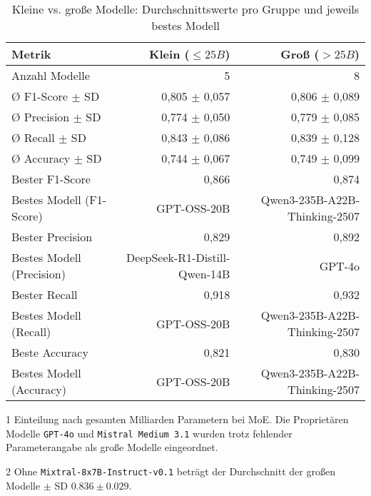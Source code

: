 \begin{table}[htbp]
 \centering
 \caption{Kleine vs. große Modelle: Durchschnittswerte pro Gruppe und jeweils bestes Modell}
 \label{tab:small-vs-large}
 \begin{adjustbox}{width=\textwidth}
  \begin{threeparttable}[width=\textwidth]
   \begin{tabular}[width=\textwidth]{l r r}
    \toprule
    \textbf{Metrik} & \textbf{Klein} ($\leq 25B$) & \textbf{Groß} ($> 25B$) \\
    \midrule
    Anzahl Modelle\tnote{1}             & 5                         & 8 \\
    Ø F1-Score $\pm$ SD\tnote{2}      & 0,805 $\pm$ 0,057                     & 0,806 $\pm$ 0,089 \\
    Ø Precision $\pm$ SD    & 0,774 $\pm$ 0,050                     & 0,779 $\pm$ 0,085 \\
    Ø Recall $\pm$ SD       & 0,843 $\pm$ 0,086                     & 0,839 $\pm$ 0,128 \\
    Ø Accuracy $\pm$ SD     & 0,744 $\pm$ 0,067                     & 0,749 $\pm$ 0,099 \\
    Bester F1-Score & 0,866                     & 0,874 \\
    Bestes Modell (F1-Score)   & GPT-OSS-20B               & Qwen3-235B-A22B-Thinking-2507 \\
    Bester Precision & 0,829                     & 0,892 \\
    Bestes Modell (Precision) & DeepSeek-R1-Distill-Qwen-14B        & GPT-4o \\
    Bester Recall & 0,918                     & 0,932 \\
    Bestes Modell (Recall)      & GPT-OSS-20B      & Qwen3-235B-A22B-Thinking-2507 \\
    Beste Accuracy & 0,821                     & 0,830 \\
    Bestes Modell (Accuracy)     & GPT-OSS-20B               & Qwen3-235B-A22B-Thinking-2507 \\
    \bottomrule
   \end{tabular}
   \begin{tablenotes}
    \footnotesize
    \item[1] Einteilung nach gesamten Milliarden Parametern bei \ac{MoE}. Die Proprietären Modelle \texttt{GPT-4o} und \texttt{Mistral Medium 3.1} wurden trotz fehlender Parameterangabe als große Modelle eingeordnet.
    \item[2] Ohne \texttt{Mixtral-8x7B-Instruct-v0.1} beträgt der Durchschnitt der großen Modelle $\pm$ SD $0.836 \pm 0.029$.
   \end{tablenotes}
  \end{threeparttable}
 \end{adjustbox}
\end{table}

